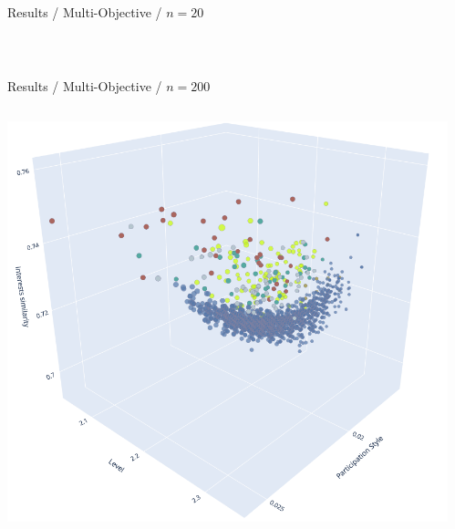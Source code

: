\documentclass{beamer}
\begin{document}
\begin{frame}{Results / Multi-Objective / $n=20$}
\begin{columns}
\begin{column}{0.30\textwidth}
                \end{column}
            \end{columns}\\
    \end{frame}
    
    \begin{frame}{Results / Multi-Objective / $n=200$}
            \begin{columns}
                \begin{column}{0.70\textwidth}
                    \includegraphics[width=\textwidth]{images/200_multi.png}
                \end{column}
                \begin{column}{0.30\textwidth}

\end{column}
\end{columns}
\end{frame}
\end{document}
